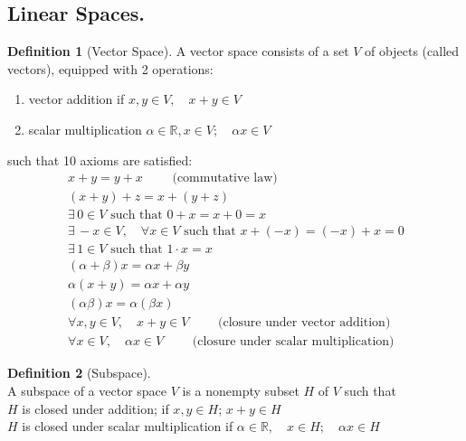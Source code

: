 \documentclass[twoside]{amsart}
\theoremstyle{plain}
\theoremstyle{definition}
\newtheorem{definition}{Definition}
\begin{document}
\subsection{ Linear Spaces.}\label{subS:Linear_Spaces}

\begin{definition}[Vector Space]\label{D:vector_space}
A vector space consists of a set $V$ of objects (called vectors), equipped with 2 operations:
\begin{enumerate}
  \item vector addition\phantom{cation} \qquad if $x,y \in V, \quad x+y \in V $
  \item scalar multiplication \qquad $\alpha \in \mathbb{R}, x \in V; \quad \alpha x \in V$
\end{enumerate}
such that 10 axioms are satisfied:
\begin{align}
  & x+y = y+x \qquad \text{ (commutative law) } \label{A:vector_space_commutativity} \\ 
  & (x+y)+z = x + (y+z)  \label{A:vector_space_associativity} \\
  & \exists \, 0 \in V  \text{ such that $0+x=x+0=x$ } \label{A:vector_space_additive_identity_existence} \\ 
  & \exists \, -x \in V, \quad \forall x \in V  \text{ such that $x + (-x) = (-x) +x = 0 $ } \label{A:vector_space_additive_reciprocal_existence}\\ 
  & \exists \, 1 \in V \text{ such that } 1 \cdot x = x \label{A:vector_space_multiplicative_identity_existence} \\
  & (\alpha + \beta) x = \alpha x + \beta y  \label{A:vector_space_scalar_addition_distributivity} \\
  & \alpha (x+y) = \alpha x + \alpha y  \label{A:vector_space_vector_addition_distributivity} \\
  & (\alpha \beta ) x = \alpha (\beta x) \label{A:vector_space_scalar_associativity} \\ 
  & \forall x, y \in V, \quad x+ y \in V \qquad \text{ (closure under vector addition) } \\
  & \forall x \in V, \quad \alpha x \in V \qquad \text{ (closure under scalar multiplication)  } 
\end{align}
\end{definition}

\begin{definition}[Subspace]\label{D:subspace} \quad \\
A subspace of a vector space $V$ is a nonempty subset $H$ of $V$ such that \\
\phantom{A sub} $H$ is closed under addition; \phantom{ ltiplication} \quad if $x, y \in H$; \quad $x+y \in H $ \\ 
\phantom{A sub} $H$ is closed under scalar multiplication \quad if $\alpha \in \mathbb{R}, \quad x \in H; \quad \alpha x \in H $
\end{definition}
\end{document}
